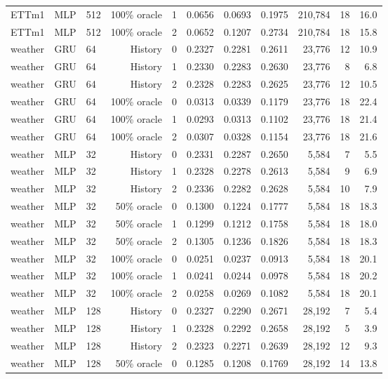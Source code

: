 \begin{landscape}
\begin{longtable}{@{}lllrlrrrrrr@{}}
ETTm1 & MLP & 512 & 100\% oracle & 1 & 0.0656 & 0.0693 & 0.1975 & 210,784 & 18 & 16.0 \\
ETTm1 & MLP & 512 & 100\% oracle & 2 & 0.0652 & 0.1207 & 0.2734 & 210,784 & 18 & 15.8 \\
weather & GRU & 64 & History & 0 & 0.2327 & 0.2281 & 0.2611 & 23,776 & 12 & 10.9 \\
weather & GRU & 64 & History & 1 & 0.2330 & 0.2283 & 0.2630 & 23,776 & 8 & 6.8 \\
weather & GRU & 64 & History & 2 & 0.2328 & 0.2283 & 0.2625 & 23,776 & 12 & 10.5 \\
weather & GRU & 64 & 100\% oracle & 0 & 0.0313 & 0.0339 & 0.1179 & 23,776 & 18 & 22.4 \\
weather & GRU & 64 & 100\% oracle & 1 & 0.0293 & 0.0313 & 0.1102 & 23,776 & 18 & 21.4 \\
weather & GRU & 64 & 100\% oracle & 2 & 0.0307 & 0.0328 & 0.1154 & 23,776 & 18 & 21.6 \\
weather & MLP & 32 & History & 0 & 0.2331 & 0.2287 & 0.2650 & 5,584 & 7 & 5.5 \\
weather & MLP & 32 & History & 1 & 0.2328 & 0.2278 & 0.2613 & 5,584 & 9 & 6.9 \\
weather & MLP & 32 & History & 2 & 0.2336 & 0.2282 & 0.2628 & 5,584 & 10 & 7.9 \\
weather & MLP & 32 & 50\% oracle & 0 & 0.1300 & 0.1224 & 0.1777 & 5,584 & 18 & 18.3 \\
weather & MLP & 32 & 50\% oracle & 1 & 0.1299 & 0.1212 & 0.1758 & 5,584 & 18 & 18.0 \\
weather & MLP & 32 & 50\% oracle & 2 & 0.1305 & 0.1236 & 0.1826 & 5,584 & 18 & 18.3 \\
weather & MLP & 32 & 100\% oracle & 0 & 0.0251 & 0.0237 & 0.0913 & 5,584 & 18 & 20.1 \\
weather & MLP & 32 & 100\% oracle & 1 & 0.0241 & 0.0244 & 0.0978 & 5,584 & 18 & 20.2 \\
weather & MLP & 32 & 100\% oracle & 2 & 0.0258 & 0.0269 & 0.1082 & 5,584 & 18 & 20.1 \\
weather & MLP & 128 & History & 0 & 0.2327 & 0.2290 & 0.2671 & 28,192 & 7 & 5.4 \\
weather & MLP & 128 & History & 1 & 0.2328 & 0.2292 & 0.2658 & 28,192 & 5 & 3.9 \\
weather & MLP & 128 & History & 2 & 0.2323 & 0.2271 & 0.2639 & 28,192 & 12 & 9.3 \\
weather & MLP & 128 & 50\% oracle & 0 & 0.1285 & 0.1208 & 0.1769 & 28,192 & 14 & 13.8 \\

\end{longtable}
\end{landscape}
